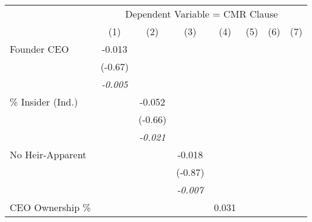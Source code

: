 {
\def\sym#1{\ifmmode^{#1}\else\(^{#1}\)\fi}
\begin{tabular}{l*{7}{c}}
\toprule
                &\multicolumn{7}{c}{Dependent Variable = CMR Clause}                                                                                 \\\cmidrule(lr){2-8}
                &\multicolumn{1}{c}{(1)}         &\multicolumn{1}{c}{(2)}         &\multicolumn{1}{c}{(3)}         &\multicolumn{1}{c}{(4)}         &\multicolumn{1}{c}{(5)}         &\multicolumn{1}{c}{(6)}         &\multicolumn{1}{c}{(7)}         \\

\midrule Founder CEO   &   -0.013         &                  &                  &                  &                  &                  &                  \\
                &  (-0.67)         &                  &                  &                  &                  &                  &                  \\
                &\textit{-0.005}         &                  &                  &                  &                  &                  &                  \\
\% Insider (Ind.)&                  &   -0.052         &                  &                  &                  &                  &                  \\
                &                  &  (-0.66)         &                  &                  &                  &                  &                  \\
                &                  &\textit{-0.021}         &                  &                  &                  &                  &                  \\
No Heir-Apparent&                  &                  &   -0.018         &                  &                  &                  &                  \\
                &                  &                  &  (-0.87)         &                  &                  &                  &                  \\
                &                  &                  &\textit{-0.007}         &                  &                  &                  &                  \\
CEO Ownership \%&                  &                  &                  &    0.031         &                  &                  &                  \\

\end{tabular}}
